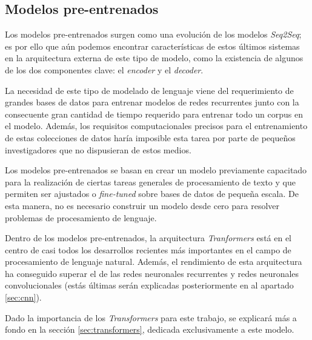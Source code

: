 \subsection{Modelos pre-entrenados}
Los modelos pre-entrenados surgen como una evolución de los modelos \textit{Seq2Seq}; es por ello que aún podemos encontrar características de estos últimos sistemas
en la arquitectura externa de este tipo de modelo, como la existencia de algunos de los dos componentes clave: el \textit{encoder} y el \textit{decoder}. 

La necesidad de este tipo de modelado de lenguaje viene del requerimiento de grandes bases de datos para entrenar modelos de redes recurrentes junto con la consecuente gran cantidad de tiempo requerido para entrenar todo un corpus en el modelo. Además, los requisitos computacionales precisos para el entrenamiento de estas colecciones de datos haría imposible esta tarea por parte de pequeños investigadores que no dispusieran de estos medios.

Los modelos pre-entrenados se basan en crear un modelo previamente capacitado para la realización de ciertas tareas generales de procesamiento de texto y que permiten ser ajustados o \textit{fine-tuned} sobre bases de datos de pequeña escala. De esta manera, no es necesario construir un modelo desde cero para resolver problemas de procesamiento de lenguaje.

Dentro de los modelos pre-entrenados, la arquitectura \textit{Tranformers} está en el centro de casi todos los desarrollos recientes más importantes en el campo de procesamiento de lenguaje natural. Además, el rendimiento de esta arquitectura ha conseguido superar el de las redes neuronales recurrentes y redes neuronales convolucionales (estás últimas serán explicadas posteriormente en al apartado \ref{sec:cnn}).

Dado la importancia de los \textit{Transformers} para este trabajo, se explicará más a fondo en la sección \ref{sec:transformers}, dedicada exclusivamente a este modelo.




